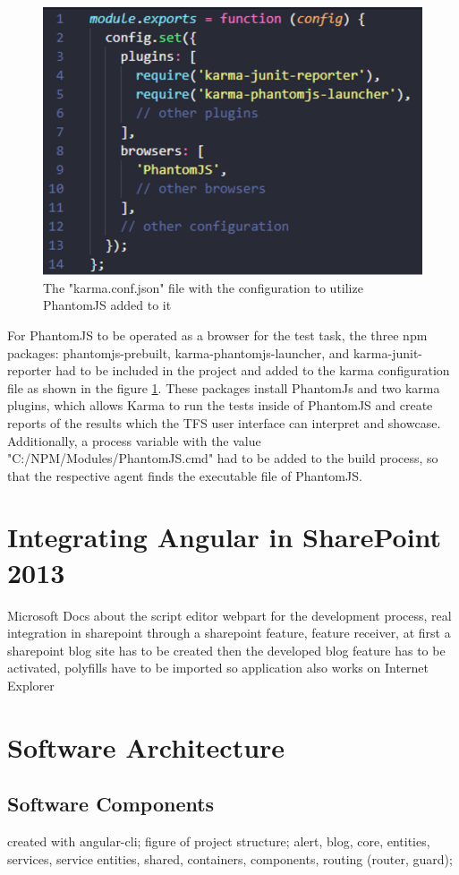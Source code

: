 \documentclass[Bachelor,BIF,english]{twbook}
\begin{document}
\\[\baselineskip]
\begin{figure}[!htbp]
\centering
\includegraphics[width=0.5\linewidth]{PICs/karma_phantomjs.eps}
\caption{The "karma.conf.json" file with the configuration to utilize PhantomJS added to it}\label{Fig2}
\end{figure}
For PhantomJS to be operated as a browser for the test task, the three npm packages: phantomjs-prebuilt, karma-phantomjs-launcher, and karma-junit-reporter had to be included in the project and added to the karma configuration file as shown in the figure \ref{Fig2}. These packages install PhantomJs and two karma plugins, which allows Karma to run the tests inside of PhantomJS and create reports of the results which the TFS user interface can interpret and showcase. Additionally, a process variable with the value "C:/NPM/Modules/PhantomJS.cmd" had to be added to the build process, so that the respective agent finds the executable file of PhantomJS.

\section{Integrating Angular in SharePoint 2013}
Microsoft Docs about the script editor webpart for the development process, real integration in sharepoint through a sharepoint feature, feature receiver, at first a sharepoint blog site has to be created then the developed blog feature has to be activated, polyfills have to be imported so application also works on Internet Explorer

\section{Software Architecture}

\subsection{Software Components}
created with angular-cli;
figure of project structure;
alert, blog, core, entities, services, service entities, shared, containers, components, routing (router, guard); 
\end{document}
